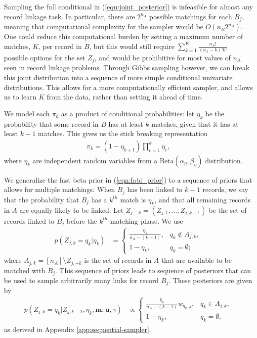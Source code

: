 \documentclass[12pt,letterpaper]{article}
\newcommand{\1}[1]{\mathbb{I}\!\left[#1\right]} %
\begin{document}
Sampling the full conditional in (\ref{eqn:joint_posterior}) is infeasible for almost any record linkage task. In particular, there are $2^{n_A}$ possible matchings for each $B_j$, meaning that computational complexity for the sampler would be $O\left(n_B 2^{n_A}\right)$. One could reduce this computational burden by setting a maximum number of matches, $K$, per record in $B$, but this would still require $\sum_{k = 1}^K \frac{n_A!}{(n_A - k)!k!}$ possible options for the set $Z_j$, and would be prohibitive for most values of $n_A$ seen in record linkage problems. Through Gibbs sampling however, we can break this joint distribution into a sequence of more simple conditional univariate distributions. This allows for a more computationally efficient sampler, and allows us to learn $K$ from the data, rather than setting it ahead of time. 

We model each $\pi_k$ as a product of conditional probabilities: let $\eta_k$ be the probability that some record in $B$ has at least $k$ matches, given that it has at least $k-1$ matches. This gives us the stick breaking representation
\begin{align}
	\pi_k = (1 - \eta_{k+1}) \prod_{c=1}^{k} \eta_c, 
\end{align}
where $\eta_k$ are independent random variables from a $\text{Beta}(\alpha_{\eta}, \beta_{\eta})$ distribution.

We generalize the fast beta prior in (\ref{eqn:fabl_prior}) to a sequence of priors that allows for multiple matchings. When $B_j$ has been linked to $k-1$ records, we say that the probability that $B_j$ has a $k^{th}$ match is $\eta_k$, and that all remaining records in $A$ are equally likely to be linked. Let $Z_{j, -k} = (Z_{j, 1}, \ldots, Z_{j, k-1})$ be the set of records linked to $B_j$ before the $k^{th}$ matching phase. We use
\begin{align} \label{eqn:sequential_prior}
	p(Z_{j, k} = q_k|\eta_k) &= \begin{cases}
		\frac{\eta_k}{n_A - (k - 1)}, &  q_k \notin A_{j, k}, \\
		1 - \eta_k, & q_k = \emptyset;
	\end{cases}
\end{align}
where $A_{j, k} = [n_A] \setminus Z_{j, -k}$ is the set of records in $A$ that are available to be matched with $B_j$. This sequence of priors leads to sequence of posteriors that can be used to sample arbitrarily many links for record $B_j$. These posteriors are given by 
\begin{align} \label{eqn:sequential_posterior}
	p(Z_{j, k} = q_k|Z_{j, k-1}, \eta_k, \bm{m}, \bm{u}, \gamma) &\propto \begin{cases}
		\frac{\eta_k}{n_A - (k - 1)} w_{q_k, j}, & q_k \in A_{j, k}, \\
		1 - \eta_k, & q_k= \emptyset,
	\end{cases}
\end{align}
as derived in Appendix \ref{app:sequential-sampler}.
\end{document}

